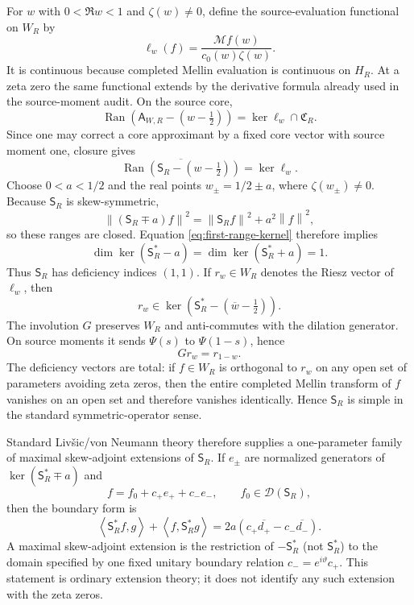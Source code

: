 \documentclass[11pt]{article}
\theoremstyle{remark}
\newcommand{\norm}[1]{\left\lVert #1\right\rVert}
\newcommand{\ip}[2]{\left\langle #1,#2\right\rangle}
\begin{document}
For $w$ with $0<\Re w<1$ and $\zeta(w)\ne0$, define the source-evaluation functional on $W_R$ by
\[
 \ell_w(f)=\frac{\mathcal M f(w)}{c_0(w)\zeta(w)}.
\]
It is continuous because completed Mellin evaluation is continuous on $H_R$.  At a zeta zero the same functional extends by the derivative formula already used in the source-moment audit.  On the source core,
\[
 \operatorname{Ran}(\mathsf A_{W,R}-(w-\tfrac12))
 =\ker\ell_w\cap\mathfrak C_R.
\]
Since one may correct a core approximant by a fixed core vector with source moment one, closure gives
\begin{equation}\label{eq:first-range-kernel}
 \overline{\operatorname{Ran}(\mathsf S_R-(w-\tfrac12))}
 =\ker\ell_w.
\end{equation}
Choose $0<a<1/2$ and the real points $w_\pm=1/2\pm a$, where $\zeta(w_\pm)\ne0$.  Because $\mathsf S_R$ is skew-symmetric,
\[
 \norm{(\mathsf S_R\mp a)f}^2=\norm{\mathsf S_Rf}^2+a^2\norm f^2,
\]
so these ranges are closed.  Equation \eqref{eq:first-range-kernel} therefore implies
\[
 \dim\ker(\mathsf S_R^*-a)=\dim\ker(\mathsf S_R^*+a)=1.
\]
Thus $\mathsf S_R$ has deficiency indices $(1,1)$.  If $r_w\in W_R$ denotes the Riesz vector of $\ell_w$, then
\begin{equation}\label{eq:deficiency-riesz}
 r_w\in\ker\!\left(\mathsf S_R^*-(\overline w-\tfrac12)\right).
\end{equation}
The involution $G$ preserves $W_R$ and anti-commutes with the dilation generator.  On source moments it sends $\Psi(s)$ to $\Psi(1-s)$, hence
\begin{equation}\label{eq:G-deficiency}
 Gr_w=r_{1-w}.
\end{equation}
The deficiency vectors are total: if $f\in W_R$ is orthogonal to $r_w$ on any open set of parameters avoiding zeta zeros, then the entire completed Mellin transform of $f$ vanishes on an open set and therefore vanishes identically.  Hence $\mathsf S_R$ is simple in the standard symmetric-operator sense.

Standard Liv\v{s}ic/von Neumann theory therefore supplies a one-parameter family of maximal skew-adjoint extensions of $\mathsf S_R$.  If $e_\pm$ are normalized generators of $\ker(\mathsf S_R^*\mp a)$ and
\[
 f=f_0+c_+e_++c_-e_-,\qquad f_0\in\mathcal D(\mathsf S_R),
\]
then the boundary form is
\begin{equation}\label{eq:boundary-form}
 \ip{\mathsf S_R^*f}{g}+\ip{f}{\mathsf S_R^*g}
 =2a\left(c_+\overline{d_+}-c_-\overline{d_-}\right).
\end{equation}
A maximal skew-adjoint extension is the restriction of $-\mathsf S_R^*$ (not $\mathsf S_R^*$) to the domain specified by one fixed unitary boundary relation $c_-=e^{i\vartheta}c_+$.  This statement is ordinary extension theory; it does not identify any such extension with the zeta zeros.
\end{document}
